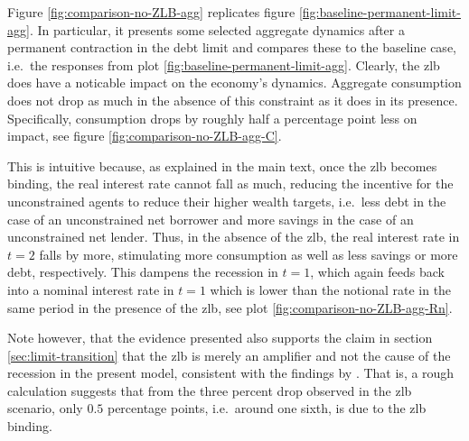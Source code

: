 \documentclass[a4paper,12pt]{article} %
\numberwithin{equation}{section} %
\numberwithin{figure}{section}
\numberwithin{table}{section}
\begin{document}
\begin{refsection}
\begin{appendices}
Figure \ref{fig:comparison-no-ZLB-agg} replicates figure \ref{fig:baseline-permanent-limit-agg}. In particular, it presents some selected aggregate dynamics after a permanent contraction in the debt limit and compares these to the baseline case, i.e.~the responses from plot \ref{fig:baseline-permanent-limit-agg}. Clearly, the \Gls{zlb} does have a noticable impact on the economy's dynamics. Aggregate consumption does not drop as much in the absence of this constraint as it does in its presence. Specifically, consumption drops by roughly half a percentage point less on impact, see figure \ref{fig:comparison-no-ZLB-agg-C}.

This is intuitive because, as explained in the main text, once the \Gls{zlb} becomes binding, the real interest rate cannot fall as much, reducing the incentive for the unconstrained agents to reduce their higher wealth targets, i.e.~less debt in the case of an unconstrained net borrower and more savings in the case of an unconstrained net lender. Thus, in the absence of the \Gls{zlb}, the real interest rate in $t=2$ falls by more, stimulating more consumption as well as less savings or more debt, respectively. This dampens the recession in $t=1$, which again feeds back into a nominal interest rate in $t=1$ which is lower than the notional rate in the same period in the presence of the \Gls{zlb}, see plot \ref{fig:comparison-no-ZLB-agg-Rn}.

Note however, that the evidence presented also supports the claim in section \ref{sec:limit-transition} that the \Gls{zlb} is merely an amplifier and not the cause of the recession in the present model, consistent with the findings by \textcite{gl2017}. That is, a rough calculation suggests that from the three percent drop observed in the \Gls{zlb} scenario, only $0.5$ percentage points, i.e.~around one sixth, is due to the \Gls{zlb} binding.


\end{appendices}
\end{refsection}
\end{document}
